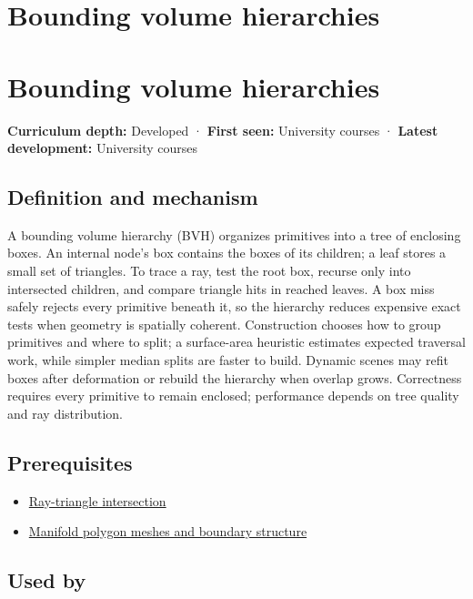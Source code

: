 \hypertarget{appendix-0b426c47dd78}{}
\section*{Bounding volume hierarchies}
\section{Bounding volume hierarchies}\label{bounding-volume-hierarchies}

\textbf{Curriculum depth:} Developed · \textbf{First seen:} University courses · \textbf{Latest development:} University courses

\subsection{Definition and mechanism}\label{definition-and-mechanism}

A bounding volume hierarchy (BVH) organizes primitives into a tree of enclosing boxes. An internal node's box contains the boxes of its children; a leaf stores a small set of triangles. To trace a ray, test the root box, recurse only into intersected children, and compare triangle hits in reached leaves. A box miss safely rejects every primitive beneath it, so the hierarchy reduces expensive exact tests when geometry is spatially coherent. Construction chooses how to group primitives and where to split; a surface-area heuristic estimates expected traversal work, while simpler median splits are faster to build. Dynamic scenes may refit boxes after deformation or rebuild the hierarchy when overlap grows. Correctness requires every primitive to remain enclosed; performance depends on tree quality and ray distribution.

\subsection{Prerequisites}\label{prerequisites}

\begin{itemize}
\tightlist
\item
  \hyperref[appendix-47ac1bd6d144]{Ray-triangle intersection}
\item
  \hyperref[appendix-fab348609369]{Manifold polygon meshes and boundary structure}
\end{itemize}

\subsection{Used by}\label{used-by}

